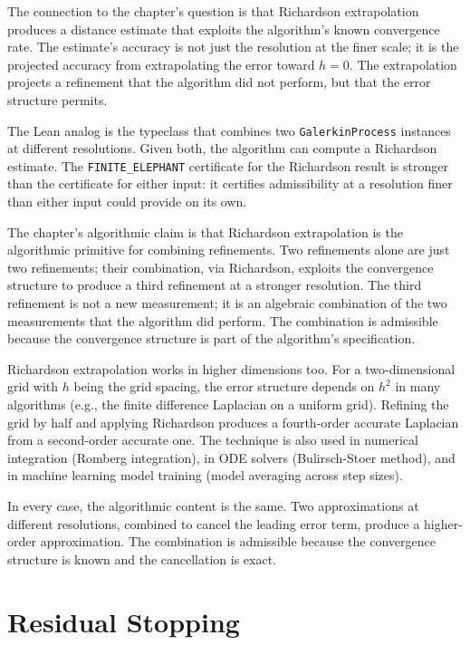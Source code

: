 The connection to the chapter's question is that Richardson
extrapolation produces a distance estimate that exploits the
algorithm's known convergence rate. The estimate's accuracy is not
just the resolution at the finer scale; it is the projected
accuracy from extrapolating the error toward $h = 0$. The
extrapolation projects a refinement that the algorithm did not
perform, but that the error structure permits.

The Lean analog is the typeclass that combines two
\texttt{GalerkinProcess} instances at different resolutions. Given
both, the algorithm can compute a Richardson estimate. The
\texttt{FINITE\_ELEPHANT} certificate for the Richardson result is
stronger than the certificate for either input: it certifies
admissibility at a resolution finer than either input could provide
on its own.

The chapter's algorithmic claim is that Richardson extrapolation is
the algorithmic primitive for combining refinements. Two
refinements alone are just two refinements; their combination, via
Richardson, exploits the convergence structure to produce a third
refinement at a stronger resolution. The third refinement is not a
new measurement; it is an algebraic combination of the two
measurements that the algorithm did perform. The combination is
admissible because the convergence structure is part of the
algorithm's specification.

Richardson extrapolation works in higher dimensions too. For a
two-dimensional grid with $h$ being the grid spacing, the error
structure depends on $h^2$ in many algorithms (e.g., the finite
difference Laplacian on a uniform grid). Refining the grid by half
and applying Richardson produces a fourth-order accurate Laplacian
from a second-order accurate one. The technique is also used in
numerical integration (Romberg integration), in ODE solvers
(Bulirsch-Stoer method), and in machine learning model training
(model averaging across step sizes).

In every case, the algorithmic content is the same. Two
approximations at different resolutions, combined to cancel the
leading error term, produce a higher-order approximation. The
combination is admissible because the convergence structure is
known and the cancellation is exact.

\section{Residual Stopping}
\label{se:residual-stopping}

